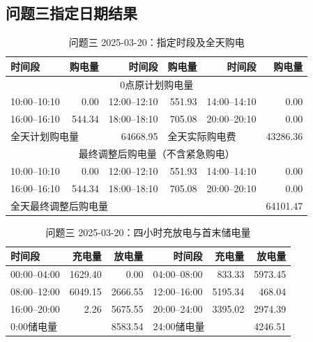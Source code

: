 \FloatBarrier
\subsection{问题三指定日期结果}
\begin{table}[htbp]\centering\scriptsize
\caption{问题三 2025-03-20：指定时段及全天购电}
\begin{tabular}{lrrrrr}\toprule
时间段 & 购电量 & 时间段 & 购电量 & 时间段 & 购电量\\\midrule
\multicolumn{6}{c}{0点原计划购电量}\\
10:00--10:10 & 0.00 & 12:00--12:10 & 551.93 & 14:00--14:10 & 0.00\\
16:00--16:10 & 544.34 & 18:00--18:10 & 705.08 & 20:00--20:10 & 0.00\\
\multicolumn{2}{l}{全天计划购电量} & 64668.95 & \multicolumn{2}{l}{全天实际购电费} & 43286.36\\
\multicolumn{6}{c}{最终调整后购电量（不含紧急购电）}\\
10:00--10:10 & 0.00 & 12:00--12:10 & 551.93 & 14:00--14:10 & 0.00\\
16:00--16:10 & 544.34 & 18:00--18:10 & 705.08 & 20:00--20:10 & 0.00\\
\multicolumn{5}{l}{全天最终调整后购电量} & 64101.47\\
\bottomrule\end{tabular}\end{table}

\begin{table}[htbp]\centering\scriptsize
\caption{问题三 2025-03-20：四小时充放电与首末储电量}
\begin{tabular}{lrrrrr}\toprule
时间段 & 充电量 & 放电量 & 时间段 & 充电量 & 放电量\\\midrule
00:00--04:00 & 1629.40 & 0.00 & 04:00--08:00 & 833.33 & 5973.45\\
08:00--12:00 & 6049.15 & 2666.55 & 12:00--16:00 & 5195.34 & 468.04\\
16:00--20:00 & 2.26 & 5675.55 & 20:00--24:00 & 3395.02 & 2974.39\\
\multicolumn{2}{l}{0:00储电量} & 8583.54 & \multicolumn{2}{l}{24:00储电量} & 4246.51\\
\bottomrule\end{tabular}\end{table}

